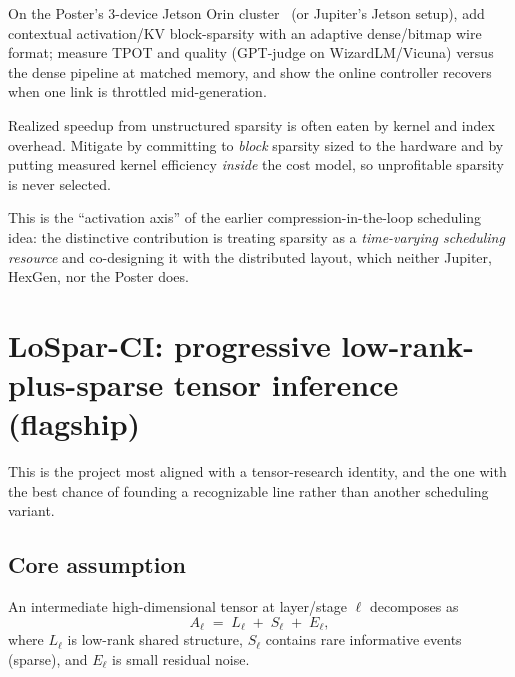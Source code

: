 \documentclass[11pt]{article}
\begin{document}
\begin{expbox}
On the Poster's 3-device Jetson Orin cluster~\cite{poster} (or Jupiter's Jetson setup),
add contextual activation/KV block-sparsity with an adaptive dense/bitmap wire format;
measure TPOT and quality (GPT-judge on WizardLM/Vicuna) versus the dense pipeline at matched
memory, and show the online controller recovers when one link is throttled mid-generation.
\end{expbox}

\begin{riskbox}
Realized speedup from unstructured sparsity is often eaten by kernel and index overhead.
Mitigate by committing to \emph{block} sparsity sized to the hardware and by putting measured
kernel efficiency \emph{inside} the cost model, so unprofitable sparsity is never selected.
\end{riskbox}

\begin{buildbox}
This is the ``activation axis'' of the earlier compression-in-the-loop scheduling idea:
the distinctive contribution is treating sparsity as a \emph{time-varying scheduling
resource} and co-designing it with the distributed layout, which neither Jupiter, HexGen,
nor the Poster does.
\end{buildbox}

\section{LoSpar-CI: progressive low-rank-plus-sparse tensor inference (flagship)}
\label{sec:lospar}

This is the project most aligned with a tensor-research identity, and the one with the best
chance of founding a recognizable line rather than another scheduling variant.

\subsection*{Core assumption}
An intermediate high-dimensional tensor at layer/stage $\ell$ decomposes as
\[
A_\ell \;=\; L_\ell \;+\; S_\ell \;+\; E_\ell,
\]
where $L_\ell$ is low-rank shared structure, $S_\ell$ contains rare informative events
(sparse), and $E_\ell$ is small residual noise.
\end{document}
